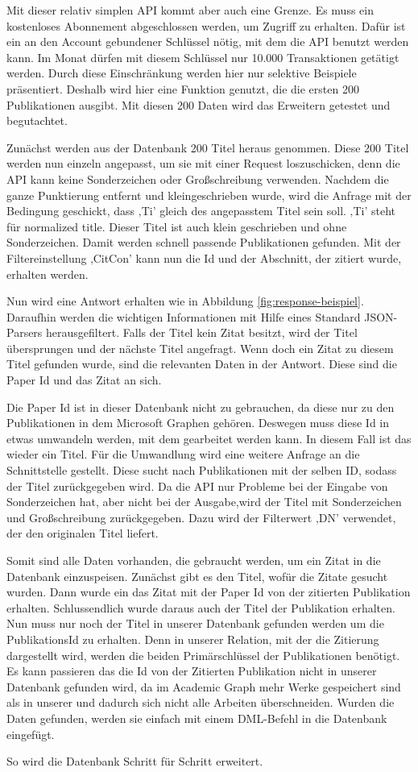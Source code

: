 Mit dieser relativ simplen API kommt aber auch eine Grenze. Es muss ein kostenloses Abonnement abgeschlossen werden, um Zugriff zu erhalten. Dafür ist ein an den Account gebundener Schlüssel nötig, mit dem die API benutzt werden kann. Im Monat dürfen mit diesem Schlüssel nur 10.000 Transaktionen getätigt werden. Durch diese Einschränkung werden hier nur selektive Beispiele präsentiert. Deshalb wird hier eine Funktion genutzt, die die ersten 200 Publikationen ausgibt. Mit diesen 200 Daten wird das Erweitern getestet und begutachtet.

Zunächst werden aus der Datenbank 200 Titel heraus genommen. Diese 200 Titel werden nun einzeln angepasst, um sie mit einer Request loszuschicken, denn die API kann keine Sonderzeichen oder Großschreibung verwenden. Nachdem die ganze Punktierung entfernt und kleingeschrieben wurde, wird die Anfrage mit der Bedingung geschickt, dass ‚Ti’ gleich des angepasstem Titel sein soll. ‚Ti’ steht für normalized title. Dieser Titel ist auch klein geschrieben und ohne Sonderzeichen. Damit werden schnell passende Publikationen gefunden. Mit der Filtereinstellung ‚CitCon’ kann nun die Id und der Abschnitt, der zitiert wurde, erhalten werden.



Nun wird eine Antwort erhalten wie in Abbildung \ref{fig:response-beispiel}. Daraufhin werden die wichtigen Informationen mit Hilfe eines Standard JSON-Parsers herausgefiltert. Falls der Titel kein Zitat besitzt, wird der Titel übersprungen und der nächste Titel angefragt. Wenn doch ein Zitat zu diesem Titel gefunden wurde, sind die relevanten Daten in der Antwort. Diese sind die Paper Id und das Zitat an sich. 

Die Paper Id ist in dieser Datenbank nicht zu gebrauchen, da diese nur zu den Publikationen in dem Microsoft Graphen gehören. Deswegen muss diese Id in etwas umwandeln werden, mit dem gearbeitet werden kann. In diesem Fall ist das wieder ein Titel. Für die Umwandlung wird eine weitere Anfrage an die Schnittstelle gestellt. Diese sucht nach Publikationen mit der selben ID, sodass der Titel zurückgegeben wird. Da die API nur Probleme bei der Eingabe von Sonderzeichen hat, aber nicht bei der Ausgabe,wird der Titel mit Sonderzeichen und Großschreibung zurückgegeben. Dazu wird der Filterwert  ‚DN’ verwendet, der den originalen Titel liefert. 

Somit sind alle Daten vorhanden, die gebraucht werden, um ein Zitat in die Datenbank einzuspeisen. Zunächst gibt es den Titel, wofür die Zitate gesucht wurden. Dann wurde ein das Zitat mit der Paper Id von der zitierten Publikation erhalten. Schlussendlich wurde daraus auch der Titel der Publikation erhalten. Nun muss nur noch der Titel in unserer Datenbank gefunden werden um die PublikationsId zu erhalten. Denn in unserer Relation, mit der die Zitierung dargestellt wird, werden die beiden Primärschlüssel der Publikationen benötigt. Es kann passieren das die Id von der Zitierten Publikation nicht in unserer Datenbank gefunden wird, da im Academic Graph mehr Werke gespeichert sind als in unserer und dadurch sich nicht alle Arbeiten überschneiden. Wurden die Daten gefunden, werden sie einfach mit einem DML-Befehl in die Datenbank eingefügt. 

So wird die Datenbank Schritt für Schritt erweitert. 





